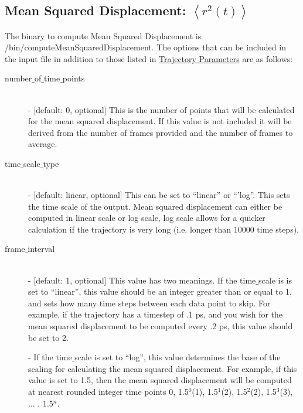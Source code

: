 \documentclass{article}
\begin{document}
\subsection{Mean Squared Displacement: $\left<r^2(t)\right>$} \label{sec::MSD_parm}
The binary to compute Mean Squared Displacement is /bin/computeMeanSquaredDisplacement.
The options that can be included in the input file in addition to those listed in \hyperref[sec::general_parameters]{Trajectory Parameters} are as follows:
\begin{description}	
	\item[number$\_$of$\_$time$\_$points]\hfill \\
	- [default: 0, optional] This is the number of points that will be calculated for the mean squared displacement.  If this value is not included it will be derived from the number of frames provided and the number of frames to average.
	
	\item[time$\_$scale$\_$type] \hfill \\
	- [default: linear, optional] This can be set to ``linear'' or ``'log''.  This sets the time scale of the output. Mean squared displacement can either be computed in linear scale or log scale, log scale allows for a quicker calculation if the trajectory is very long (i.e. longer than 10000 time steps).
	
	\item[frame$\_$interval] \hfill \\
	- [default: 1, optional] This value has two meanings.  If the time$\_$scale is is set to ``linear'', this value should be an integer greater than or equal to 1, and sets how many time steps between each data point to skip.  For example, if the trajectory has a timestep of .1 ps, and you wish for the mean squared displacement to be computed every .2 ps, this value should be set to 2. 
	
	- If the time$\_$scale is set to ``log'', this value determines the base of the scaling for calculating the mean squared displacement.  For example, if this value is set to 1.5, then the mean squared displacement will be computed at nearest rounded integer time points 0, 1.5$^0$(1), 1.5$^1$(2), 1.5$^2$(2), 1.5$^3$(3), ... , 1.5$^{n}$.
	
\end{description}
\end{document}
